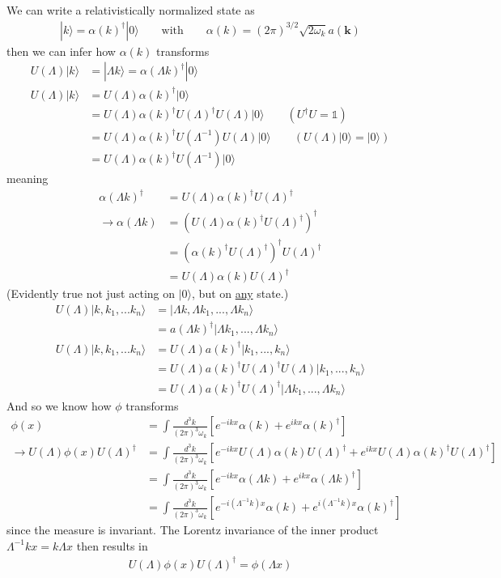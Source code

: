 \documentclass{article}
\begin{document}
We can write a relativistically normalized state as
\begin{align}
|k\rangle=\alpha(k)^\dagger |0\rangle\qquad\text{with}\qquad\alpha(k)=(2\pi)^{3/2}\sqrt{2\omega_k}a(\mathbf{k})
\end{align}
then we can infer how $\alpha(k)$ transforms
\begin{align}
U(\Lambda)|k\rangle&=|\Lambda k\rangle=\alpha(\Lambda k)^\dagger|0\rangle\\
U(\Lambda)|k\rangle
&=U(\Lambda)\alpha(k)^\dagger|0\rangle\\
&=U(\Lambda)\alpha(k)^\dagger U(\Lambda)^\dagger U(\Lambda)|0\rangle\qquad(U^\dagger U=\mathbb{1})\\
&=U(\Lambda)\alpha(k)^\dagger U(\Lambda^{-1})U(\Lambda)|0\rangle\qquad (U(\Lambda)|0\rangle=|0\rangle)\\
&=U(\Lambda)\alpha(k)^\dagger U(\Lambda^{-1})|0\rangle
\end{align}
meaning
\begin{align}
\alpha(\Lambda k)^\dagger
&=U(\Lambda)\alpha(k)^\dagger U(\Lambda)^\dagger\\
\rightarrow\alpha(\Lambda k)
&=(U(\Lambda)\alpha(k)^\dagger U(\Lambda)^\dagger)^\dagger\\
&=(\alpha(k)^\dagger U(\Lambda)^\dagger)^\dagger U(\Lambda)^\dagger\\
&=U(\Lambda) \alpha(k) U(\Lambda)^\dagger
\end{align}
(Evidently true not just acting on $|0\rangle$, but on \underline{any} state.) 
\begin{align}
U(\Lambda)|k,k_1,...k_n\rangle
&=|\Lambda k,\Lambda k_1,...,\Lambda k_n\rangle\\
&=a(\Lambda k)^\dagger|\Lambda k_1,...,\Lambda k_n\rangle\\
U(\Lambda)|k,k_1,...k_n\rangle
&=U(\Lambda)a(k)^\dagger|k_1,...,k_n\rangle\\
&=U(\Lambda)a(k)^\dagger U(\Lambda)^\dagger U(\Lambda)|k_1,...,k_n\rangle\\
&=U(\Lambda)a(k)^\dagger U(\Lambda)^\dagger|\Lambda k_1,...,\Lambda k_n\rangle
\end{align}
And so we know how $\phi$ transforms
\begin{align}
\phi(x)&=\int\frac{d^3k}{(2\pi)^3\omega_k}\left[e^{-ikx}\alpha(k)+e^{ikx}\alpha(k)^\dagger\right]\\
\rightarrow U(\Lambda)\phi(x)U(\Lambda)^\dagger
&=\int\frac{d^3k}{(2\pi)^3\omega_k}\left[e^{-ikx}U(\Lambda)\alpha(k)U(\Lambda)^\dagger+e^{ikx}U(\Lambda)\alpha(k)^\dagger U(\Lambda)^\dagger\right]\\
&=\int\frac{d^3k}{(2\pi)^3\omega_k}\left[e^{-ikx}\alpha(\Lambda k)+e^{ikx}\alpha(\Lambda k)^\dagger \right]\\
&=\int\frac{d^3k}{(2\pi)^3\omega_k}\left[e^{-i(\Lambda^{-1} k)x}\alpha(k)+e^{i(\Lambda^{-1} k)x}\alpha(k)^\dagger \right]
\end{align}
since the measure is invariant. The Lorentz invariance of the inner product $\Lambda^{-1}k x=k\Lambda x$ then results in
\begin{align}
U(\Lambda)\phi(x)U(\Lambda)^\dagger=\phi(\Lambda x)
\end{align}
\end{document}
